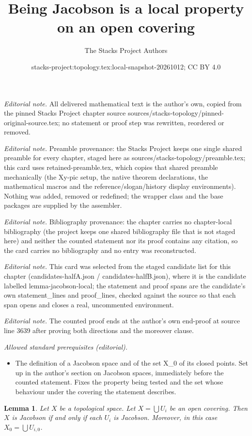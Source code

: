 \documentclass[10pt,a4paper]{amsart}
\title{Being Jacobson is a local property on an open covering}
\author{The Stacks Project Authors}
\date{stacks-project:topology.tex:local-snapshot-20261012; CC BY 4.0}
\theoremstyle{plain}
\newtheorem{lemma}[subsection]{Lemma}
\theoremstyle{definition}
\theoremstyle{remark}
\numberwithin{equation}{subsection}
\begin{document}
\maketitle
\noindent\textit{Editorial note.} All delivered mathematical text is the author's own, copied from the pinned Stacks Project chapter source sources/stacks-topology/pinned-original-source.tex; no statement or proof step was rewritten, reordered or removed.\par\medskip
\noindent\textit{Editorial note.} Preamble provenance: the Stacks Project keeps one single shared preamble for every chapter, staged here as sources/stacks-topology/preamble.tex; this card uses retained-preamble.tex, which copies that shared preamble mechanically (the Xy-pic setup, the native theorem declarations, the mathematical macros and the reference/slogan/history display environments). Nothing was added, removed or redefined; the wrapper class and the base packages are supplied by the assembler.\par\medskip
\noindent\textit{Editorial note.} Bibliography provenance: the chapter carries no chapter-local bibliography (the project keeps one shared bibliography file that is not staged here) and neither the counted statement nor its proof contains any citation, so the card carries no bibliography and no entry was reconstructed.\par\medskip
\noindent\textit{Editorial note.} This card was selected from the staged candidate list for this chapter (candidates-halfA.json / candidates-halfB.json), where it is the candidate labelled lemma-jacobson-local; the statement and proof spans are the candidate's own statement\_lines and proof\_lines, checked against the source so that each span opens and closes a real, uncommented environment.\par\medskip
\noindent\textit{Editorial note.} The counted proof ends at the author's own end-proof at source line 3639 after proving both directions and the moreover clause.\par\medskip
\noindent\textit{Allowed standard prerequisites (editorial).}\begin{itemize}
\item The definition of a Jacobson space and of the set X\_0 of its closed points. Set up in the author's section on Jacobson spaces, immediately before the counted statement. Fixes the property being tested and the set whose behaviour under the covering the statement describes.
\end{itemize}\medskip
\begin{lemma}
\label{lemma-jacobson-local}
Let $X$ be a topological space.
Let $X = \bigcup U_i$ be an open covering.
Then $X$ is Jacobson if and only if each $U_i$ is Jacobson.
Moreover, in this case $X_0 = \bigcup U_{i, 0}$.
\end{lemma}
\end{document}
